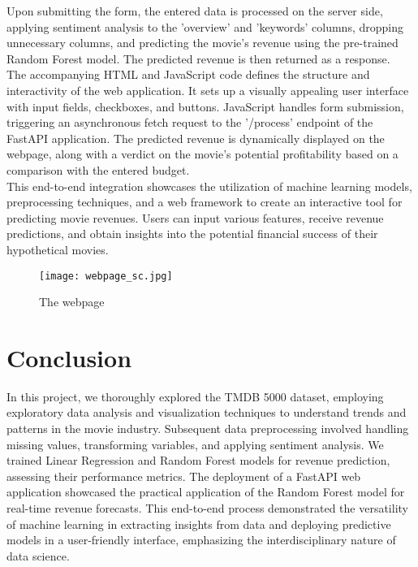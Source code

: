 \documentclass[conference]{IEEEtran}
\begin{document}
Upon submitting the form, the entered data is processed on the server side, applying sentiment analysis to the 'overview' and 'keywords' columns, dropping unnecessary columns, and predicting the movie's revenue using the pre-trained Random Forest model. The predicted revenue is then returned as a response.\\

The accompanying HTML and JavaScript code defines the structure and interactivity of the web application. It sets up a visually appealing user interface with input fields, checkboxes, and buttons. JavaScript handles form submission, triggering an asynchronous fetch request to the '/process' endpoint of the FastAPI application. The predicted revenue is dynamically displayed on the webpage, along with a verdict on the movie's potential profitability based on a comparison with the entered budget.\\

This end-to-end integration showcases the utilization of machine learning models, preprocessing techniques, and a web framework to create an interactive tool for predicting movie revenues. Users can input various features, receive revenue predictions, and obtain insights into the potential financial success of their hypothetical movies.\\

\begin{figure}[htbp]
    \centerline{\texttt{[image: webpage\_sc.jpg]}}
    \caption{The webpage}
    \label{fig:enter-label}
\end{figure}

\section{Conclusion}

In this project, we thoroughly explored the TMDB 5000 dataset, employing exploratory data analysis and visualization techniques to understand trends and patterns in the movie industry. Subsequent data preprocessing involved handling missing values, transforming variables, and applying sentiment analysis. We trained Linear Regression and Random Forest models for revenue prediction, assessing their performance metrics. The deployment of a FastAPI web application showcased the practical application of the Random Forest model for real-time revenue forecasts. This end-to-end process demonstrated the versatility of machine learning in extracting insights from data and deploying predictive models in a user-friendly interface, emphasizing the interdisciplinary nature of data science.
\end{document}
